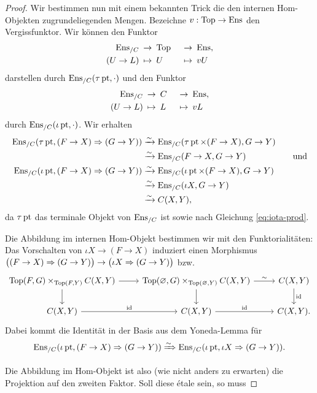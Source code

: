 \begin{proof}
  Wir bestimmen nun mit einem bekannten Trick die den internen
  Hom-Objekten zugrundeliegenden Mengen. Bezeichne $v: \operatorname{Top} \to \operatorname{Ens}$
  den Vergissfunktor. Wir können den Funktor
  \begin{alignat*}{2}
    \operatorname{Ens}_{/C} \: &\to \: \operatorname{Top} \: &&\to \: \operatorname{Ens}, \\
    (U \to L) \: &\mapsto \: U \: &&\mapsto \: vU
  \end{alignat*}
  darstellen durch $\operatorname{Ens}_{/C}(\tau \operatorname{pt}, \cdot)$
  und den Funktor
  \begin{alignat*}{2}
    \operatorname{Ens}_{/C} \: &\to \: C \: &&\to \: \operatorname{Ens}, \\
    (U \to L) \: &\mapsto \: L \: &&\mapsto \: vL
  \end{alignat*}
  durch $\operatorname{Ens}_{/C}(\iota \operatorname{pt}, \cdot)$. Wir erhalten
  \begin{align*}
    \operatorname{Ens}_{/C}(\tau \operatorname{pt}, (F \to X) \Rightarrow (G \to Y))
    &\xrightarrow[]{\sim} \operatorname{Ens}_{/C}(\tau \operatorname{pt} \times (F \to X), G \to Y) \quad & \\
    &\xrightarrow[]{\sim} \operatorname{Ens}_{/C}(F \to X, G \to Y) & \text{und} \\
    \operatorname{Ens}_{/C}(\iota \operatorname{pt}, (F \to X) \Rightarrow (G \to Y))
    &\xrightarrow[]{\sim} \operatorname{Ens}_{/C}(\iota \operatorname{pt} \times (F \to X), G \to Y) \\
    &\xrightarrow[]{\sim} \operatorname{Ens}_{/C}(\iota X, G \to Y) \\
    &\xrightarrow[]{\sim} C(X, Y),
  \end{align*}
  da $\tau \operatorname{pt}$ das terminale Objekt von $\operatorname{Ens}_{/C}$ ist sowie nach
  Gleichung \ref{eq:iota-prod}.

  Die Abbildung im internen Hom-Objekt bestimmen wir mit den
  Funktorialitäten: Das Vorschalten von $\iota X \to (F \to X)$
  induziert einen Morphismus $\big( (F \to X) \Rightarrow (G \to Y) \big)
  \to \big( \iota X \Rightarrow (G \to Y) \big)$ bzw.
  \[ \begin{tikzcd}
    \Top(F, G) \times_{\Top(F, Y)} C(X, Y) \dar \rar
    & \Top(\varnothing, G) \times_{\Top(\varnothing, Y)} C(X, Y) \dar \rar{\sim}
    & C(X, Y) \dar{\id} \\
    C(X, Y) \rar{\id}
    & C(X, Y) \rar{\id}
    & C(X, Y).
  \end{tikzcd} \]
  Dabei kommt die Identität in der Basis aus dem Yoneda-Lemma für
  \[ \operatorname{Ens}_{/C}(\iota \operatorname{pt}, (F \to X) \Rightarrow (G \to Y))
  \xRightarrow{\sim} \operatorname{Ens}_{/C}(\iota \operatorname{pt}, \iota X \Rightarrow (G \to Y)). \]

  Die Abbildung im Hom-Objekt ist also (wie nicht anders zu erwarten)
  die Projektion auf den zweiten Faktor. Soll diese étale sein, so
  muss %

\end{proof}
  

